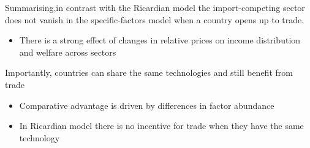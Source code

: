 \documentclass{beamer}
\begin{document}
\begin{frame}
 Summarising,in contrast with the Ricardian model the import-competing sector does not vanish in the specific-factors model when a country opens up to trade. 
 \begin{itemize}
  \item There is a strong effect of changes in relative prices on income distribution and welfare across sectors
 \end{itemize}
 \medskip
 Importantly, countries can share the same technologies and still benefit from trade
 \begin{itemize}
   \item Comparative advantage is driven by differences in factor abundance
   \item In Ricardian model there is no incentive for trade when they have the same technology
 \end{itemize}
\end{frame}

\end{document}
